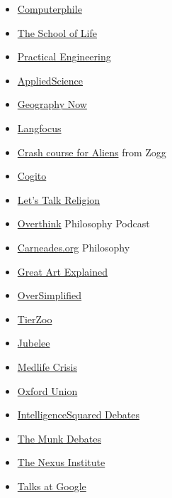 \documentclass{article}
\begin{document}
\begin{itemize}
\begin{itemize}
    \item \href{https://www.youtube.com/channel/UC9-y-6csu5WGm29I7JiwpnA}{Computerphile}
    \item \href{https://www.youtube.com/channel/UC7IcJI8PUf5Z3zKxnZvTBog}{The School of Life}
    \item \href{https://www.youtube.com/user/gradyhillhouse}{Practical Engineering}
    \item \href{https://www.youtube.com/c/AppliedScience}{AppliedScience}
    \item \href{https://www.youtube.com/user/GeographyNow}{Geography Now}
    \item \href{https://www.youtube.com/channel/UCNhX3WQEkraW3VHPyup8jkQ}{Langfocus}
    \item \href{https://www.youtube.com/channel/UCKY00CSQo1MoC27bdGd-w_g}{Crash course for Aliens} from Zogg
    \item \href{https://www.youtube.com/channel/UCKMnl27hDMKvch--noWe5CA}{Cogito}
    \item \href{https://www.youtube.com/channel/UC9dRb4fbJQIbQ3KHJZF_z0g}{Let's Talk Religion}
    \item \href{https://www.youtube.com/c/OverthinkPodcastPhilosophy}{Overthink} Philosophy Podcast
    \item \href{https://www.youtube.com/c/carneadesofcyrene}{Carneades.org} Philosophy
    \item \href{https://www.youtube.com/channel/UCePDFpCr78_qmVtpoB1Axaw}{Great Art Explained}
    \item \href{https://www.youtube.com/channel/UCNIuvl7V8zACPpTmmNIqP2A}{OverSimplified}
    \item \href{https://www.youtube.com/channel/UCHsRtomD4twRf5WVHHk-cMw}{TierZoo}
    \item \href{https://www.youtube.com/channel/UCJjSDX-jUChzOEyok9XYRJQ}{Jubelee}
    \item \href{https://www.youtube.com/channel/UCgRBRE1DUP2w7HTH9j_L4OQ}{Medlife Crisis}
    \item \href{https://www.youtube.com/channel/UCY7dD6waquGnKTZSumPMTlQ}{Oxford Union}
    \item \href{https://www.youtube.com/channel/UCenxjWEkb0Sv67vejOgZ3Tg}{IntelligenceSquared Debates}
    \item \href{https://www.youtube.com/user/TheMunkDebates}{The Munk Debates}
    \item \href{https://www.youtube.com/user/TheNexusInstitute}{The Nexus Institute}
    \item \href{https://www.youtube.com/c/talksatgoogle}{Talks at Google}
    \end{itemize}
    

\end{itemize}
\end{document}
